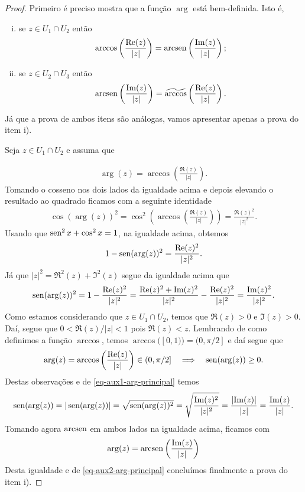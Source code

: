 \begin{proof}
Primeiro é preciso mostra que a função $\arg$ está bem-definida. Isto é,

\begin{enumerate}[i)]
\item se $z\in U_1\cap U_2$ então 
\[
\arccos\left( \displaystyle\frac{\mathrm{Re}(z)}{|z|} \right)
=
\operatorname{arcsen}\left( \displaystyle\frac{\mathrm{Im}(z)}{|z|} \right);
\]

\item se $z\in U_2\cap U_3$ então 
\[
\operatorname{arcsen}\left( \displaystyle\frac{\mathrm{Im}(z)}{|z|} \right)
=
\widetilde{\arccos}\left( \displaystyle\frac{\mathrm{Re}(z)}{|z|} \right).
\]
\end{enumerate}

Já que a prova de ambos itens são análogas, vamos apresentar apenas a
prova do item i).

Seja $z\in U_1\cap U_2$ e assuma que 

\begin{align}\label{eq-aux2-arg-principal}
\arg(z) 
=
\arccos\left( \displaystyle\frac{\Re(z)}{|z|} \right).
\end{align}
Tomando o cosseno nos dois lados da igualdade acima e depois elevando o resultado ao quadrado 
ficamos com a seguinte identidade
\begin{align*}
\cos(\arg(z))^2
=
\cos^2 \left(  \arccos\left( \displaystyle\frac{\Re(z)}{|z|} \right) \right)
=
\frac{\Re(z)^2}{|z|^2}.
\end{align*}
Usando que $\operatorname{sen}^{2}x+\cos^{2}x=1$, na igualdade acima, obtemos
\begin{align*}
1-\operatorname{sen}(\arg(z))^2 = \frac{\mathrm{Re}(z)^2}{|z|^2}.
\end{align*}
Já que $|z|^2= \Re^2(z)+\Im^2(z)$ segue da igualdade acima que
\begin{align}\label{eq-aux1-arg-principal}
\operatorname{sen}(\arg(z))^2 
= 1 - \frac{\mathrm{Re}(z)^2}{|z|^2} 
= \frac{\mathrm{Re}(z)^2+\mathrm{Im}(z)^2}{|z|^2}-\frac{\mathrm{Re}(z)^2}{|z|^2}
= \frac{\mathrm{Im}(z)^2}{|z|^2}.
\end{align}
Como estamos considerando que $z\in U_1\cap U_2$, temos que $\Re(z)>0$ e $\Im(z)>0$. 
Daí, segue que $0<\Re(z)/|z|<1$ pois $\Re(z) < z$.
Lembrando de como definimos a função $\arccos$, temos 
$\arccos([0,1))=(0,\pi/2]$ e daí segue que 
\[
\arg(z) 
=
\arccos\left( \displaystyle\frac{\mathrm{Re}(z)}{|z|} \right)
\in 
(0,\pi/2]
\quad \Longrightarrow\quad 
\operatorname{sen}(\arg(z))\geq 0.
\]
Destas observações e  de \eqref{eq-aux1-arg-principal}
temos
\[
\operatorname{sen}(\arg(z))
=
|\operatorname{sen}(\arg(z))|
=
\sqrt{\operatorname{sen}(\arg(z))^2}
=
\sqrt{
\frac{\mathrm{Im}(z)^2}{|z|^2}
}
=
\frac{|\mathrm{Im}(z)|}{|z|}
=
\frac{\mathrm{Im}(z)}{|z|}.
\]
Tomando agora $\operatorname{arcsen}$ em ambos lados na igualdade acima, ficamos com
\[
\arg(z) = \operatorname{arcsen}\left( \displaystyle\frac{\mathrm{Im}(z)}{|z|} \right)
\]
Desta igualdade e de \eqref{eq-aux2-arg-principal} 
concluímos finalmente a prova do item i).



\end{proof}

